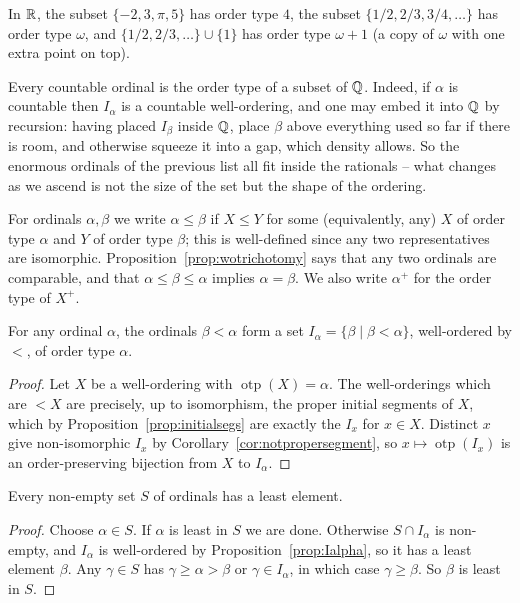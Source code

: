 \documentclass[a4paper]{scrartcl}
\newcommand{\otp}{\operatorname{otp}}
\begin{document}
\begin{example}
  In $\mathbb{R}$, the subset $\{-2, 3, \pi, 5\}$ has order type $4$, the subset $\{1/2, 2/3, 3/4, \dots\}$ has order type $\omega$, and $\{1/2, 2/3, \dots\} \cup \{1\}$ has order type $\omega + 1$ (a copy of $\omega$ with one extra point on top).
\end{example}

\begin{example}
  Every countable ordinal is the order type of a subset of $\mathbb{Q}$. Indeed, if $\alpha$ is countable then $I_\alpha$ is a countable well-ordering, and one may embed it into $\mathbb{Q}$ by recursion: having placed $I_\beta$ inside $\mathbb{Q}$, place $\beta$ above everything used so far if there is room, and otherwise squeeze it into a gap, which density allows. So the enormous ordinals of the previous list all fit inside the rationals -- what changes as we ascend is not the size of the set but the shape of the ordering.
\end{example}

For ordinals $\alpha, \beta$ we write $\alpha \leq \beta$ if $X \leq Y$ for some (equivalently, any) $X$ of order type $\alpha$ and $Y$ of order type $\beta$; this is well-defined since any two representatives are isomorphic. Proposition~\ref{prop:wotrichotomy} says that any two ordinals are comparable, and that $\alpha \leq \beta \leq \alpha$ implies $\alpha = \beta$. We also write $\alpha^+$ for the order type of $X^+$.

\begin{proposition}\label{prop:Ialpha}
  For any ordinal $\alpha$, the ordinals $\beta < \alpha$ form a set $I_\alpha = \{\beta \mid \beta < \alpha\}$, well-ordered by $<$, of order type $\alpha$.
\end{proposition}
\begin{proof}
  Let $X$ be a well-ordering with $\otp(X) = \alpha$. The well-orderings which are $< X$ are precisely, up to isomorphism, the proper initial segments of $X$, which by Proposition~\ref{prop:initialsegs} are exactly the $I_x$ for $x \in X$. Distinct $x$ give non-isomorphic $I_x$ by Corollary~\ref{cor:notpropersegment}, so $x \mapsto \otp(I_x)$ is an order-preserving bijection from $X$ to $I_\alpha$.
\end{proof}

\begin{proposition}\label{prop:ordinalswo}
  Every non-empty set $S$ of ordinals has a least element.
\end{proposition}
\begin{proof}
  Choose $\alpha \in S$. If $\alpha$ is least in $S$ we are done. Otherwise $S \cap I_\alpha$ is non-empty, and $I_\alpha$ is well-ordered by Proposition~\ref{prop:Ialpha}, so it has a least element $\beta$. Any $\gamma \in S$ has $\gamma \geq \alpha > \beta$ or $\gamma \in I_\alpha$, in which case $\gamma \geq \beta$. So $\beta$ is least in $S$.
\end{proof}
\end{document}

